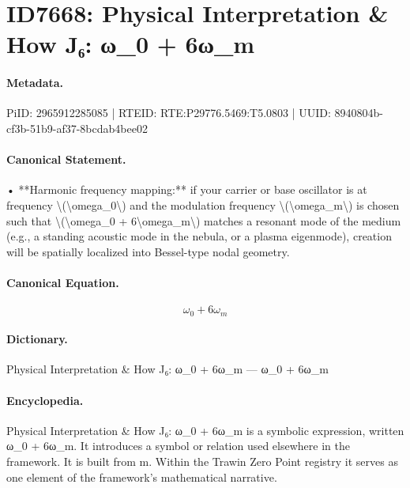 \section*{ID7668: Physical Interpretation \& How J₆: ω\_0 + 6ω\_m}
\paragraph{Metadata.}
PiID: 2965912285085 | RTEID: RTE:P29776.5469:T5.0803 | UUID: 8940804b-cf3b-51b9-af37-8bcdab4bee02

\paragraph{Canonical Statement.}
• **Harmonic frequency mapping:** if your carrier or base oscillator is at frequency \textbackslash{}(\textbackslash{}omega\_0\textbackslash{}) and the modulation frequency \textbackslash{}(\textbackslash{}omega\_m\textbackslash{}) is chosen such that \textbackslash{}(\textbackslash{}omega\_0 + 6\textbackslash{}omega\_m\textbackslash{}) matches a resonant mode of the medium (e.g., a standing acoustic mode in the nebula, or a plasma eigenmode), creation will be spatially localized into Bessel-type nodal geometry.

\paragraph{Canonical Equation.}
\[
\omega_0 + 6\omega_m
\]

\paragraph{Dictionary.}
Physical Interpretation \& How J₆: ω\_0 + 6ω\_m — ω\_0 + 6ω\_m

\paragraph{Encyclopedia.}
Physical Interpretation \& How J₆: ω\_0 + 6ω\_m is a symbolic expression, written ω\_0 + 6ω\_m. It introduces a symbol or relation used elsewhere in the framework. It is built from m. Within the Trawin Zero Point registry it serves as one element of the framework's mathematical narrative.
